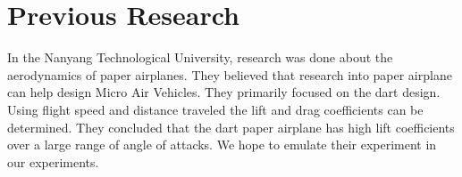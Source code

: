 \section{Previous Research}

In the Nanyang Technological University, research was done about the aerodynamics of 
paper airplanes. They believed that research into paper airplane can help design
Micro Air Vehicles. They primarily focused on the dart design. Using flight speed and
distance traveled the lift and drag coefficients can be determined. They concluded that
the dart paper airplane has high lift coefficients over a large range of angle of attacks. 
We hope to emulate their experiment in our experiments.
